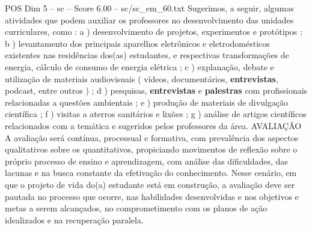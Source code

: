 \begin{textsample}{POS Dim 5 – sc – Score 6.00 – sc/sc\_em\_60.txt}
Sugerimos, a seguir, algumas atividades que podem auxiliar os professores no desenvolvimento das unidades curriculares, como : a ) desenvolvimento de projetos, experimentos e protótipos ; b ) levantamento dos principais aparelhos eletrônicos e eletrodomésticos existentes nas residências dos(as) estudantes, e respectivas transformações de energia, cálculo de consumo de energia elétrica ; c ) explanação, debate e utilização de materiais audiovisuais ( vídeos, documentários, \textbf{entrevistas}, podcast, entre outros ) ; d ) pesquisas, \textbf{entrevistas} e \textbf{palestras} com profissionais relacionadas a questões ambientais ; e ) produção de materiais de divulgação científica ; f ) visitas a aterros sanitários e lixões ; g ) análise de artigos científicos relacionados com a temática e sugeridos pelos professores da área.
AVALIAÇÃO A avaliação será contínua, processual e formativa, com prevalência dos aspectos qualitativos sobre os quantitativos, propiciando movimentos de reflexão sobre o próprio processo de ensino e aprendizagem, com análise das dificuldades, das lacunas e na busca constante da efetivação do conhecimento.
Nesse cenário, em que o projeto de vida do(a) estudante está em construção, a avaliação deve ser pautada no processo que ocorre, nas habilidades desenvolvidas e nos objetivos e metas a serem alcançados, no comprometimento com os planos de ação idealizados e na recuperação paralela.

\end{textsample}
